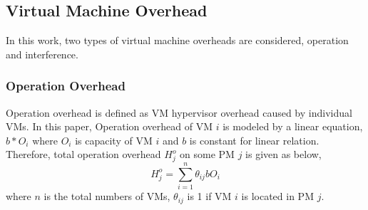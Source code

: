 


\subsection{Virtual Machine Overhead}
In this work, two types of virtual machine overheads are considered, operation and interference.
\subsubsection{Operation Overhead}
Operation overhead is defined as VM hypervisor overhead caused by individual VMs. In this paper, Operation overhead of VM $i$ is modeled by a linear equation, $b*O_i$ where $O_i$ is capacity of VM $i$ and $b$ is constant for linear relation.
Therefore, total operation overhead $H_{j}^{o}$ on some PM $j$ is given as below,
\begin{equation}
H_{j}^{o}=\sum_{i=1}^n \theta_{ij} b O_i
\label{operationover}
\end{equation}
 where $n$ is the total numbers of VMs, $\theta_{ij}$ is 1 if  VM $i$ is located in PM $j$.

